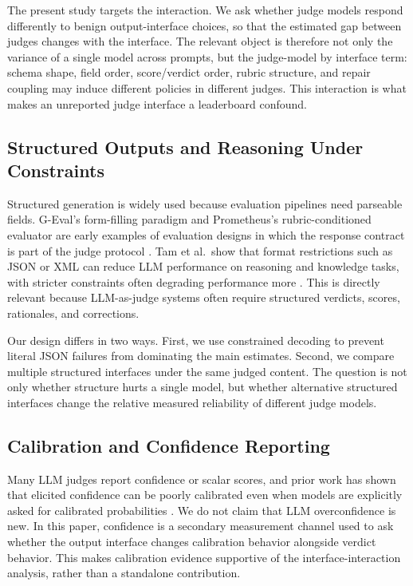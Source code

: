 \documentclass[journal]{IEEEtran}
\begin{document}
The present study targets the interaction. We ask whether judge models respond differently to benign output-interface choices, so that the estimated gap between judges changes with the interface. The relevant object is therefore not only the variance of a single model across prompts, but the judge-model by interface term: schema shape, field order, score/verdict order, rubric structure, and repair coupling may induce different policies in different judges. This interaction is what makes an unreported judge interface a leaderboard confound.

\subsection{Structured Outputs and Reasoning Under Constraints}
\label{sec:rw-structured}

Structured generation is widely used because evaluation pipelines need parseable fields. G-Eval's form-filling paradigm and Prometheus's rubric-conditioned evaluator are early examples of evaluation designs in which the response contract is part of the judge protocol \citep{liu2023geval, kim2024prometheus}. Tam et al.\ show that format restrictions such as JSON or XML can reduce LLM performance on reasoning and knowledge tasks, with stricter constraints often degrading performance more \citep{tam2024speak}. This is directly relevant because LLM-as-judge systems often require structured verdicts, scores, rationales, and corrections.

Our design differs in two ways. First, we use constrained decoding to prevent literal JSON failures from dominating the main estimates. Second, we compare multiple structured interfaces under the same judged content. The question is not only whether structure hurts a single model, but whether alternative structured interfaces change the relative measured reliability of different judge models.

\subsection{Calibration and Confidence Reporting}
\label{sec:rw-calibration}

Many LLM judges report confidence or scalar scores, and prior work has shown that elicited confidence can be poorly calibrated even when models are explicitly asked for calibrated probabilities \citep{tian2023justask}. We do not claim that LLM overconfidence is new. In this paper, confidence is a secondary measurement channel used to ask whether the output interface changes calibration behavior alongside verdict behavior. This makes calibration evidence supportive of the interface-interaction analysis, rather than a standalone contribution.
\end{document}
